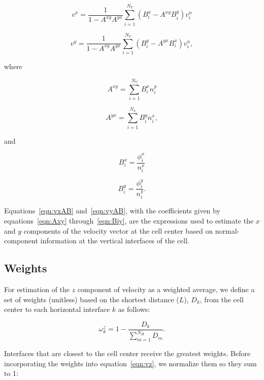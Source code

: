 \begin{equation}
\label{eqn:vxAB}
v^x = \frac{1}{1 - A^{xy} A^{yx}} \sum_{i=1}^{N_V}  \left( B_i^x - A^{xy} B_i^y \right ) v_i^n
\end{equation}

\begin{equation}
\label{eqn:vyAB}
v^y = \frac{1}{1 - A^{xy} A^{yx}} \sum_{i=1}^{N_V}  \left( B_i^y - A^{yx} B_i^x \right ) v_i^n,
\end{equation}

\noindent where

\begin{equation}
\label{eqn:Axy}
A^{xy} = \sum_{i=1}^{N_V} B_i^x n_i^y
\end{equation}

\begin{equation}
\label{eqn:Ayx}
A^{yx} = \sum_{i=1}^{N_V} B_i^y n_i^x,
\end{equation}

\noindent and

\begin{equation}
\label{eqn:Bix}
B_i^x = \frac{\phi_i^x}{n_i^x}
\end{equation}

\begin{equation}
\label{eqn:Biy}
B_i^y = \frac{\phi_i^y}{n_i^y}.
\end{equation}

\noindent Equations~\ref{eqn:vxAB} and~\ref{eqn:vyAB}, with the coefficients given by equations~\ref{eqn:Axy} through~\ref{eqn:Biy}, are the expressions used to estimate the $x$ and $y$ components of the velocity vector at the cell center based on normal-component information at the vertical interfaces of the cell.

\subsection{Weights} \label{sec:weights}

For estimation of the $z$ component of velocity as a weighted average, we define a set of weights (unitless) based on the shortest distance ($L$), $D_k$, from the cell center to each horizontal interface $k$ as follows:

\begin{equation}
\label{eqn:omegaz}
\omega_k^z = 1 - \frac{D_k}{\sum_{m=1}^{N_H} D_m}.
\end{equation}

\noindent Interfaces that are closest to the cell center receive the greatest weights. Before incorporating the weights into equation~\ref{eqn:vz}, we normalize them so they sum to 1:

